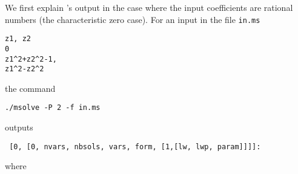 \documentclass[a4paper,english,11pt]{scrartcl}
\theoremstyle{definition}
\theoremstyle{remark}
\begin{document}
We first explain \msolve's output in the case where the input coefficients are 
rational numbers (the characteristic zero case).
For an input in the file \verb+in.ms+
\begin{tcolorbox}
\begin{verbatim}
z1, z2
0
z1^2+z2^2-1,
z1^2-z2^2
\end{verbatim}
\end{tcolorbox}
the command
\begin{tcolorbox}
\begin{verbatim}
./msolve -P 2 -f in.ms
\end{verbatim}
\end{tcolorbox}
\msolve outputs
\begin{verbatim}
 [0, [0, nvars, nbsols, vars, form, [1,[lw, lwp, param]]]]:
\end{verbatim}
where
\end{document}
